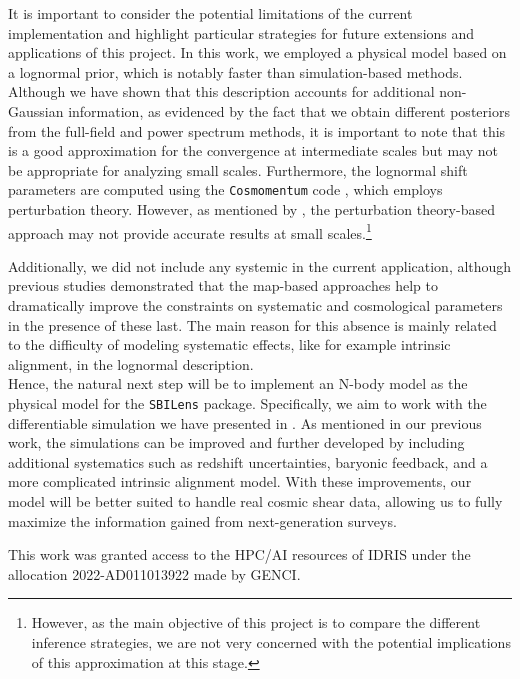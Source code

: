 \documentclass{aa}
\begin{document}
It is important to consider the potential limitations of the current implementation and highlight particular strategies for future extensions and applications of this project. In this work, we employed a physical model based on a lognormal prior, which is notably faster than simulation-based methods. Although we have shown that this description accounts for additional non-Gaussian information, as evidenced by the fact that we obtain different posteriors from the full-field and power spectrum methods, it is important to note that this is a good approximation for the convergence at intermediate scales but may not be appropriate for analyzing small scales. 
Furthermore, the lognormal shift parameters are computed using the \texttt{Cosmomentum} code \citep{friedrich2018density, friedrich2020primordial}, which employs perturbation theory. However, as mentioned by \citet{boruah2022map}, the perturbation theory-based approach may not provide accurate results at small scales.\footnote{However, as the main objective of this project is to compare the different inference strategies, we are not very concerned with the potential implications of this approximation at this stage.}

Additionally, we did not include any systemic in the current application, although previous studies demonstrated that the map-based approaches help to dramatically improve the constraints on systematic and cosmological parameters in the presence of these last. The main reason for this absence is mainly related to the difficulty of modeling systematic effects, like for example intrinsic alignment, in the lognormal description. \\
Hence, the natural next step will be to implement an N-body model as the physical model for the \texttt{SBILens} package. 
Specifically, we aim to work with the differentiable simulation we have presented in \citet{}. As mentioned in our previous work, the simulations can be improved and further developed by including additional systematics such as redshift uncertainties, baryonic feedback, and a more complicated intrinsic alignment model.
With these improvements, our model will be better suited to handle real cosmic shear data, allowing us to fully maximize the information gained from next-generation surveys. 
 
\begin{acknowledgements}
This work was granted access to the HPC/AI resources of IDRIS under the allocation 2022-AD011013922 made by GENCI.
\end{acknowledgements}
 
\end{document}
